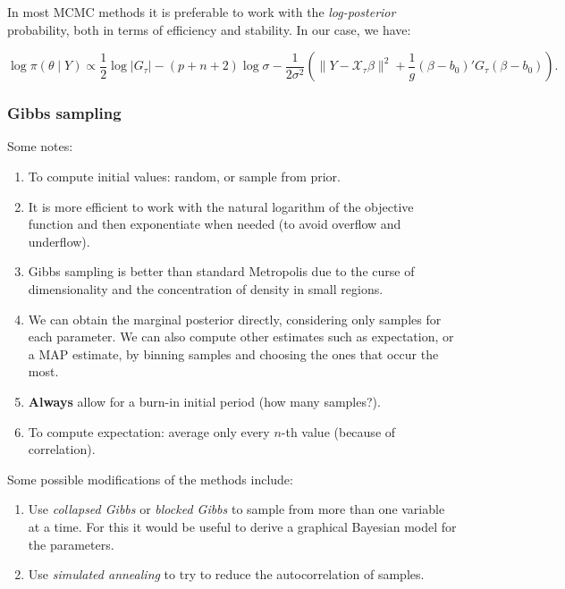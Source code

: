 \documentclass[
  a4paper,
	fontsize=11pt, %
	twoside=false, %
  secnumdepth=2,
	numbers=noenddot, %
]{kaohandt}
\begin{document}
In most MCMC methods it is preferable to work with the \textit{log-posterior} probability, both in terms of efficiency and stability. In our case, we have:
\begin{widepar}
  \[
    \log \pi(\theta\mid Y) \propto \frac{1}{2}\log |G_\tau| - (p+n+2)\log \sigma -\frac{1}{2\sigma^2} \left(\|Y- \mathcal X_\tau\beta\|^2 + \frac{1}{g}(\beta - b_0)'G_\tau(\beta - b_0) \right).
  \]
\end{widepar}

\subsubsection{Gibbs sampling}

Some notes:

\begin{enumerate}
  \item To compute initial values: random, or sample from prior.
  \item It is more efficient to work with the natural logarithm of the objective function and then exponentiate when needed (to avoid overflow and underflow).
  \item Gibbs sampling is better than standard Metropolis due to the curse of dimensionality and the concentration of density in small regions.
  \item We can obtain the marginal posterior directly, considering only samples for each parameter. We can also compute other estimates such as expectation, or a MAP estimate, by binning samples and choosing the ones that occur the most.
  \item \textbf{Always} allow for a burn-in initial period (how many samples?).
  \item To compute expectation: average only every \(n\)-th value (because of correlation).
\end{enumerate}

Some possible modifications of the methods include:

\begin{enumerate}
  \item Use \textit{collapsed Gibbs} or \textit{blocked Gibbs} to sample from more than one variable at a time. For this it would be useful to derive a graphical Bayesian model for the parameters.
  \item Use \textit{simulated annealing} to try to reduce the autocorrelation of samples.

\end{enumerate}
\end{document}
